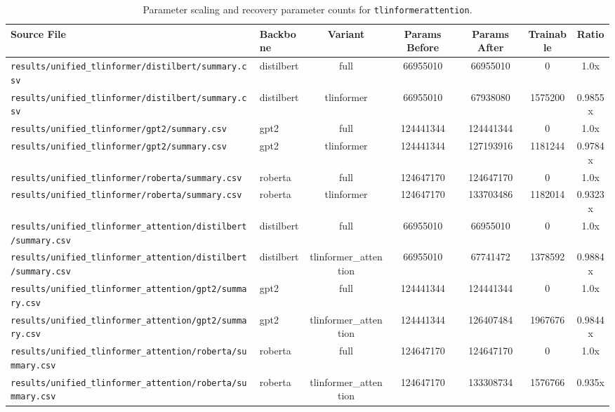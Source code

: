\begin{table}[t]
\centering
\small
\begin{tabular}{llccccc}
\toprule
\textbf{Source File} & \textbf{Backbone} & \textbf{Variant} & \textbf{Params Before} & \textbf{Params After} & \textbf{Trainable} & \textbf{Ratio} \\
\midrule
\texttt{results/unified\_tlinformer/distilbert/summary.csv} & distilbert & full & 66955010 & 66955010 & 0 & 1.0x \\
\texttt{results/unified\_tlinformer/distilbert/summary.csv} & distilbert & tlinformer & 66955010 & 67938080 & 1575200 & 0.9855x \\
\texttt{results/unified\_tlinformer/gpt2/summary.csv} & gpt2 & full & 124441344 & 124441344 & 0 & 1.0x \\
\texttt{results/unified\_tlinformer/gpt2/summary.csv} & gpt2 & tlinformer & 124441344 & 127193916 & 1181244 & 0.9784x \\
\texttt{results/unified\_tlinformer/roberta/summary.csv} & roberta & full & 124647170 & 124647170 & 0 & 1.0x \\
\texttt{results/unified\_tlinformer/roberta/summary.csv} & roberta & tlinformer & 124647170 & 133703486 & 1182014 & 0.9323x \\
\texttt{results/unified\_tlinformer\_attention/distilbert/summary.csv} & distilbert & full & 66955010 & 66955010 & 0 & 1.0x \\
\texttt{results/unified\_tlinformer\_attention/distilbert/summary.csv} & distilbert & tlinformer\_attention & 66955010 & 67741472 & 1378592 & 0.9884x \\
\texttt{results/unified\_tlinformer\_attention/gpt2/summary.csv} & gpt2 & full & 124441344 & 124441344 & 0 & 1.0x \\
\texttt{results/unified\_tlinformer\_attention/gpt2/summary.csv} & gpt2 & tlinformer\_attention & 124441344 & 126407484 & 1967676 & 0.9844x \\
\texttt{results/unified\_tlinformer\_attention/roberta/summary.csv} & roberta & full & 124647170 & 124647170 & 0 & 1.0x \\
\texttt{results/unified\_tlinformer\_attention/roberta/summary.csv} & roberta & tlinformer\_attention & 124647170 & 133308734 & 1576766 & 0.935x \\
\bottomrule
\end{tabular}
\caption{Parameter scaling and recovery parameter counts for \texttt{tlinformerattention}.}
\label{tab:results_params_tlinformerattention}
\end{table}

